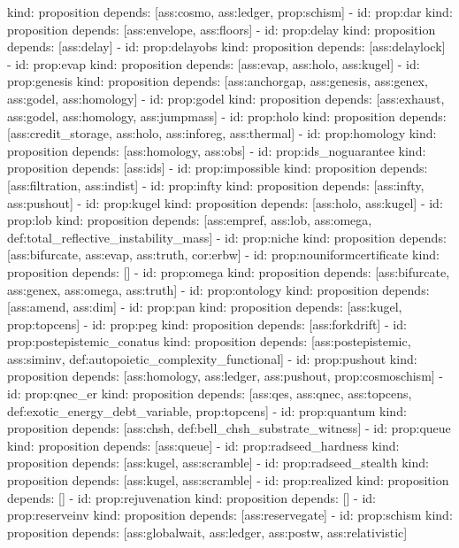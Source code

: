 \documentclass[11pt,a4paper]{article}
\theoremstyle{definition}
\theoremstyle{remark}
\begin{document}
\begin{YAML}
  kind: proposition
  depends: [ass:cosmo, ass:ledger, prop:schism]
- id: prop:dar
  kind: proposition
  depends: [ass:envelope, ass:floors]
- id: prop:delay
  kind: proposition
  depends: [ass:delay]
- id: prop:delayobs
  kind: proposition
  depends: [ass:delaylock]
- id: prop:evap
  kind: proposition
  depends: [ass:evap, ass:holo, ass:kugel]
- id: prop:genesis
  kind: proposition
  depends: [ass:anchorgap, ass:genesis, ass:genex, ass:godel, ass:homology]
- id: prop:godel
  kind: proposition
  depends: [ass:exhaust, ass:godel, ass:homology, ass:jumpmass]
- id: prop:holo
  kind: proposition
  depends: [ass:credit_storage, ass:holo, ass:inforeg, ass:thermal]
- id: prop:homology
  kind: proposition
  depends: [ass:homology, ass:obs]
- id: prop:ids_noguarantee
  kind: proposition
  depends: [ass:ids]
- id: prop:impossible
  kind: proposition
  depends: [ass:filtration, ass:indist]
- id: prop:infty
  kind: proposition
  depends: [ass:infty, ass:pushout]
- id: prop:kugel
  kind: proposition
  depends: [ass:holo, ass:kugel]
- id: prop:lob
  kind: proposition
  depends: [ass:empref, ass:lob, ass:omega, def:total_reflective_instability_mass]
- id: prop:niche
  kind: proposition
  depends: [ass:bifurcate, ass:evap, ass:truth, cor:erbw]
- id: prop:nouniformcertificate
  kind: proposition
  depends: []
- id: prop:omega
  kind: proposition
  depends: [ass:bifurcate, ass:genex, ass:omega, ass:truth]
- id: prop:ontology
  kind: proposition
  depends: [ass:amend, ass:dim]
- id: prop:pan
  kind: proposition
  depends: [ass:kugel, prop:topcens]
- id: prop:peg
  kind: proposition
  depends: [ass:forkdrift]
- id: prop:postepistemic_conatus
  kind: proposition
  depends: [ass:postepistemic, ass:siminv, def:autopoietic_complexity_functional]
- id: prop:pushout
  kind: proposition
  depends: [ass:homology, ass:ledger, ass:pushout, prop:cosmoschism]
- id: prop:qnec_er
  kind: proposition
  depends: [ass:qes, ass:qnec, ass:topcens, def:exotic_energy_debt_variable, prop:topcens]
- id: prop:quantum
  kind: proposition
  depends: [ass:chsh, def:bell_chsh_substrate_witness]
- id: prop:queue
  kind: proposition
  depends: [ass:queue]
- id: prop:radseed_hardness
  kind: proposition
  depends: [ass:kugel, ass:scramble]
- id: prop:radseed_stealth
  kind: proposition
  depends: [ass:kugel, ass:scramble]
- id: prop:realized
  kind: proposition
  depends: []
- id: prop:rejuvenation
  kind: proposition
  depends: []
- id: prop:reserveinv
  kind: proposition
  depends: [ass:reservegate]
- id: prop:schism
  kind: proposition
  depends: [ass:globalwait, ass:ledger, ass:postw, ass:relativistic]

\end{YAML}
\end{document}
